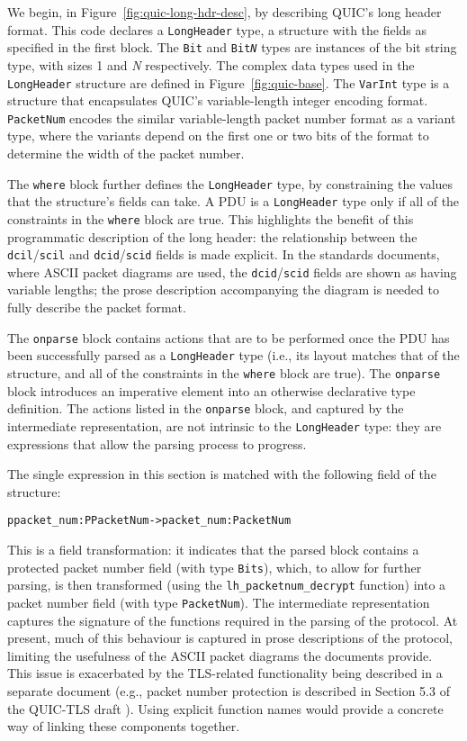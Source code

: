 \documentclass[10pt,sigconf]{acmart}
\begin{document}
We begin, in Figure~\ref{fig:quic-long-hdr-desc}, by describing QUIC's long header
format. This code declares a \texttt{LongHeader} type, a structure with the fields as
specified in the first block. The \texttt{Bit} and \texttt{Bit\emph{N}} types are instances
of the bit string type, with sizes 1 and \emph{N} respectively. The complex data types 
used in the \texttt{LongHeader} structure are defined in Figure~\ref{fig:quic-base}. The
\texttt{VarInt} type is a structure that encapsulates QUIC's variable-length integer
encoding format. \texttt{PacketNum} encodes the similar variable-length packet number
format as a variant type, where the variants depend on the first one or two bits of the
format to determine the width of the packet number.

The \texttt{where} block further defines the \texttt{LongHeader} type, by constraining the
values that the structure's fields can take. A PDU is a \texttt{LongHeader} type only if
all of the constraints in the \texttt{where} block are true. This highlights the benefit
of this programmatic description of the long header: the relationship
between the \texttt{dcil}/\texttt{scil} and \texttt{dcid}/\texttt{scid} fields is made
explicit. In the standards documents, where ASCII packet diagrams are used, the
\texttt{dcid}/\texttt{scid} fields are shown as having variable lengths; the prose
description accompanying the diagram is needed to fully describe the packet format.

The \texttt{onparse} block contains actions that are to be performed once the PDU has been
successfully parsed as a \texttt{LongHeader} type (i.e., its layout matches that of
the structure, and all of the constraints in the \texttt{where} block are true). The
\texttt{onparse} block introduces an imperative element into an otherwise declarative type
definition. The actions listed in the \texttt{onparse} block, and captured by the intermediate
representation, are not intrinsic to the \texttt{LongHeader} type: they are expressions that
allow the parsing process to progress.

The
single expression in this section is matched with the following field of the structure:
\footnotesize
\begin{alltt}
    ppacket_num : PPacketNum -> packet_num : PacketNum
\end{alltt}
\normalsize
This is a field transformation: it indicates that the parsed block
contains a protected packet number field (with type \texttt{Bits}), which, to allow
for further parsing, is then transformed (using the \texttt{lh\_packetnum\_decrypt} function)
into a packet number field (with type \texttt{PacketNum}). The intermediate
representation captures the signature of the functions required in the parsing of the
protocol. At present, much of this behaviour is captured in prose descriptions of the
protocol, limiting the usefulness of the ASCII packet diagrams the documents provide.
This issue is exacerbated by the TLS-related functionality being described in a separate
document (e.g., packet number protection is described in Section 5.3 of the
QUIC-TLS draft \cite{draft-ietf-quic-tls-14}). Using explicit function names would provide
a concrete way of linking these components together. 
\end{document}
